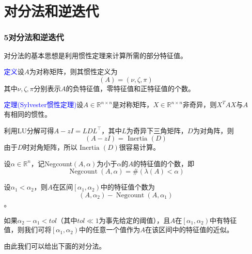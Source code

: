 \documentclass[notheorems,serif]{beamer}
\begin{document}
\section{对分法和逆迭代}
\begin{frame}
\frametitle{5\qquad 对分法和逆迭代}

对分法的基本思想是利用惯性定理来计算所需的部分特征值。

\textcolor{blue}{定义}\quad 设$A$为对称矩阵，则其惯性定义为$$
(A)=(\nu, \zeta, \pi)
$$
其中$\nu, \zeta, \pi$分别表示$A$的负特征值，零特征值和正特征值的个数。

\textcolor{blue}{定理(Sylvester惯性定理)}\quad 设$A \in \mathbb{R}^{n \times n}$是对称矩阵，$X \in \mathbb{R}^{n \times n}$非奇异，则$X^TAX$与$A$有相同的惯性。
\end{frame}
\begin{frame}

利用LU分解可得$A-z I=L D L^{\top}$，其中$L$为奇异下三角矩阵，$D$为对角阵，则$$
(A-z I)=\text { Inertia }(D)
$$
由于$D$时对角矩阵，所以$\text { Inertia }(D)$很容易计算。

设$\alpha \in \mathbb{R}^{n}$，记Negcount$(A,\alpha)$为小于$\alpha$的$A$的特征值的个数，即$$
\operatorname{Negcount}(A, \alpha)=\#(\lambda(A)<\alpha)
$$

设$\alpha_{1}<\alpha_{2}$，则$A$在区间$\left[\alpha_{1}, \alpha_{2}\right)$中的特征值个数为$$
\left(A, \alpha_{2}\right)-\operatorname{Negcount}\left(A, \alpha_{1}\right)
$$。

如果$\alpha_{2}-\alpha_{1}<t o l$（其中$tol\ll 1$为事先给定的阈值），且$A$在$\left[\alpha_{1}, \alpha_{2}\right)$中有特征值，则我们可将$\left[\alpha_{1}, \alpha_{2}\right)$中的任意一个值作为$A$在该区间中的特征值的近似。

由此我们可以给出下面的对分法。\\
\end{frame}
\newpage
\end{document}
